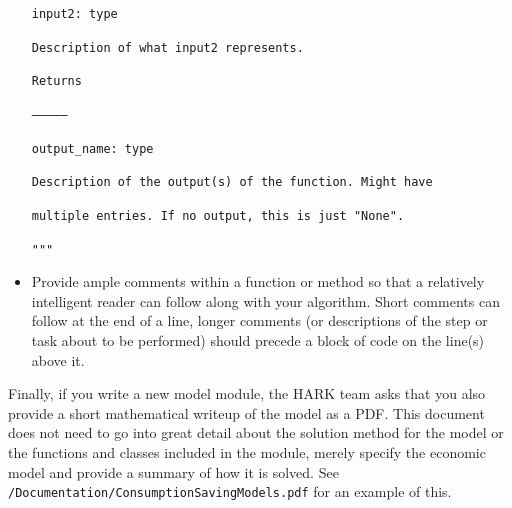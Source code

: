 \documentclass[12pt,titlepage,letterpaper]{econtex}
\begin{document}
\begin{itemize}
\hspace{0.9cm}\texttt{input2: type}

\hspace{1.8cm}\texttt{Description of what input2 represents.}

\vspace{0.5cm}

\hspace{0.9cm}\texttt{Returns}

\hspace{0.9cm}\texttt{--------------}

\hspace{0.9cm}\texttt{output\_name: type}

\hspace{1.8cm}\texttt{Description of the output(s) of the function.  Might have}

\hspace{1.8cm}\texttt{multiple entries.  If no output, this is just "None".}  

\hspace{0.9cm}\texttt{"""}

\item Provide ample comments within a function or method so that a relatively intelligent reader can follow along with your algorithm.  Short comments can follow at the end of a line, longer comments (or descriptions of the step or task about to be performed) should precede a block of code on the line(s) above it.
\end{itemize}

Finally, if you write a new model module, the HARK team asks that you also provide a short mathematical writeup of the model as a PDF.  This document does not need to go into great detail about the solution method for the model or the functions and classes included in the module, merely specify the economic model and provide a summary of how it is solved.  See \texttt{/Documentation/ConsumptionSavingModels.pdf} for an example of this.
\end{document}
